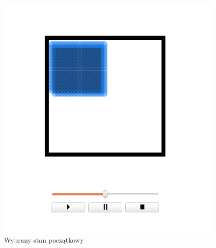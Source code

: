 \begin{minipage}{0.5\textwidth}
\begin{figure}[H]
 \begin{center} 
  \includegraphics[width=\textwidth]{./rysunki/poczatek} 
 \end{center}
 \caption{Wybrany stan początkowy}
 \label{fig:poczatek} 
\end{figure}
\end{minipage}\\[0.1cm]

